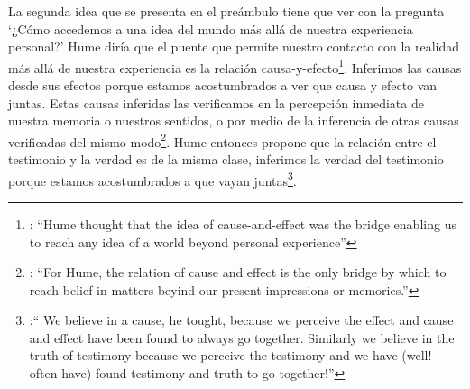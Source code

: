 La segunda idea que se presenta en el preámbulo tiene que ver con la pregunta \enquote*{¿Cómo accedemos a una idea del mundo más allá de nuestra experiencia personal?} Hume diría que el puente que permite nuestro contacto con la realidad más allá de nuestra experiencia es la relación causa-y-efecto\footnote{\cite[Cf.~][3]{anscombe2008faith:tobelieve}: \enquote{Hume thought that the idea of cause-and-effect was the bridge enabling us to reach any idea of a world beyond personal experience}}. Inferimos las causas desde sus efectos porque estamos acostumbrados a ver que causa y efecto van juntas. Estas causas inferidas las verificamos en la percepción inmediata de nuestra memoria o nuestros sentidos, o por medio de la inferencia de otras causas verificadas del mismo modo\footnote{\cite[Cf.~][87]{anscombe1981parmenides:humeandjulius}: \enquote{For Hume, the relation of cause and effect is the only bridge by which to reach belief in matters beyind our present impressions or memories.}}. Hume entonces propone que la relación entre el testimonio y la verdad es de la misma clase, inferimos la verdad del testimonio porque estamos acostumbrados a que vayan juntas\footnote{\cite[Cf.~][3]{anscombe2008faith:tobelieve}:\enquote{ We believe in a cause, he tought, because we perceive the effect and cause and effect have been found to always go together. Similarly we believe in the truth of testimony because we perceive the testimony and we have (well! often have) found testimony and truth to go together!}}.

